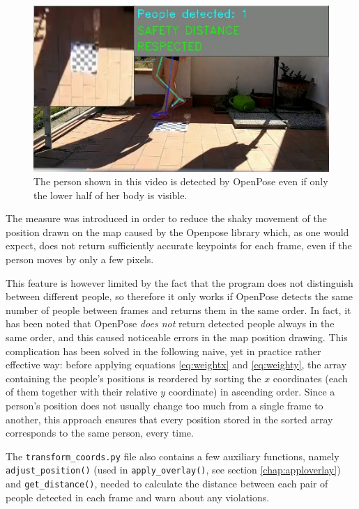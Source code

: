 \documentclass[12pt]{article}
\begin{document}
\begin{figure}[H]
\begin{center}
    \includegraphics[width=0.8\linewidth]{img/feet.jpg}
\end{center}
   \caption{The person shown in this video is detected by OpenPose even if only the lower half of her body is visible.}
\label{fig:feet}
\end{figure}

The measure was introduced in order to reduce the shaky movement of the position drawn on the map caused by the Openpose library which, as one would expect, does not return sufficiently accurate keypoints for each frame, even if the person moves by only a few pixels.

This feature is however limited by the fact that the program does not distinguish between different people, so therefore it only works if OpenPose detects the same number of people between frames and returns them in the same order. In fact, it has been noted that OpenPose \textit{does not} return detected people always in the same order, and this caused noticeable errors in the map position drawing. This complication has been solved in the following naive, yet in practice rather effective way: before applying equations \ref{eq:weightx} and \ref{eq:weighty}, the array containing the people's positions is reordered by sorting the $x$ coordinates (each of them together with their relative $y$ coordinate) in ascending order. Since a person's position does not usually change too much from a single frame to another, this approach ensures that every position stored in the sorted array corresponds to the same person, every time.

The \lstinline{transform_coords.py} file also contains a few auxiliary functions, namely \lstinline{adjust_position()} (used in \lstinline{apply_overlay()}, see section \ref{chap:apploverlay}) and \lstinline{get_distance()}, needed to calculate the distance between each pair of people detected in each frame and warn about any violations.
\end{document}
